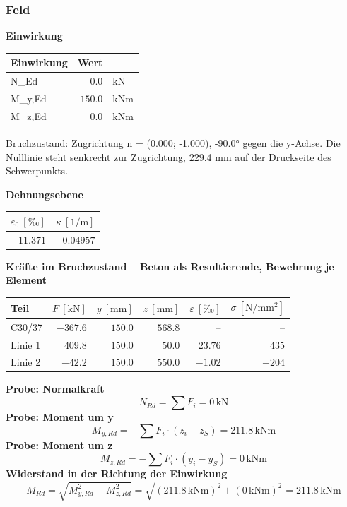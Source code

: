 \documentclass[11pt,a4paper]{article}
\begin{document}
\subsubsection{Feld}
\noindent\textbf{Einwirkung}
\begin{longtable}{lrl}
\hline
Einwirkung & Wert &  \\
\hline
\endhead
N\_Ed & $0.0$ & kN \\
M\_y,Ed & $150.0$ & kNm \\
M\_z,Ed & $0.0$ & kNm \\
\hline
\end{longtable}
Bruchzustand: Zugrichtung n = (0.000; -1.000), -90.0° gegen die y-Achse. Die Nulllinie steht senkrecht zur Zugrichtung, 229.4 mm auf der Druckseite des Schwerpunkts.

\noindent\textbf{Dehnungsebene}
\begin{longtable}{rr}
\hline
$\varepsilon_0\ [\text{‰}]$ & $\kappa\ [\mathrm{1/m}]$ \\
\hline
\endhead
$11.371$ & $0.04957$ \\
\hline
\end{longtable}
\noindent\textbf{Kräfte im Bruchzustand – Beton als Resultierende, Bewehrung je Element}
\begin{longtable}{lrrrrr}
\hline
Teil & $F\ [\mathrm{kN}]$ & $y\ [\mathrm{mm}]$ & $z\ [\mathrm{mm}]$ & $\varepsilon\ [\text{‰}]$ & $\sigma\ [\mathrm{N/mm^2}]$ \\
\hline
\endhead
C30/37 & $-367.6$ & $150.0$ & $568.8$ & – & – \\
Linie 1 & $409.8$ & $150.0$ & $50.0$ & $23.76$ & $435$ \\
Linie 2 & $-42.2$ & $150.0$ & $550.0$ & $-1.02$ & $-204$ \\
\hline
\end{longtable}
\noindent\textbf{Probe: Normalkraft}
\begin{equation*}
N_{Rd} = \sum F_i = 0\,\mathrm{kN}
\end{equation*}
\noindent\textbf{Probe: Moment um y}
\begin{equation*}
M_{y,Rd} = -\sum F_i \cdot (z_i - z_S) = 211.8\,\mathrm{kNm}
\end{equation*}
\noindent\textbf{Probe: Moment um z}
\begin{equation*}
M_{z,Rd} = -\sum F_i \cdot (y_i - y_S) = 0\,\mathrm{kNm}
\end{equation*}
\noindent\textbf{Widerstand in der Richtung der Einwirkung}
\begin{equation*}
M_{Rd} = \sqrt{M_{y,Rd}^{2} + M_{z,Rd}^{2}} = \sqrt{\left(211.8\,\mathrm{kNm}\right)^{2} + \left(0\,\mathrm{kNm}\right)^{2}} = 211.8\,\mathrm{kNm}
\end{equation*}
\end{document}

